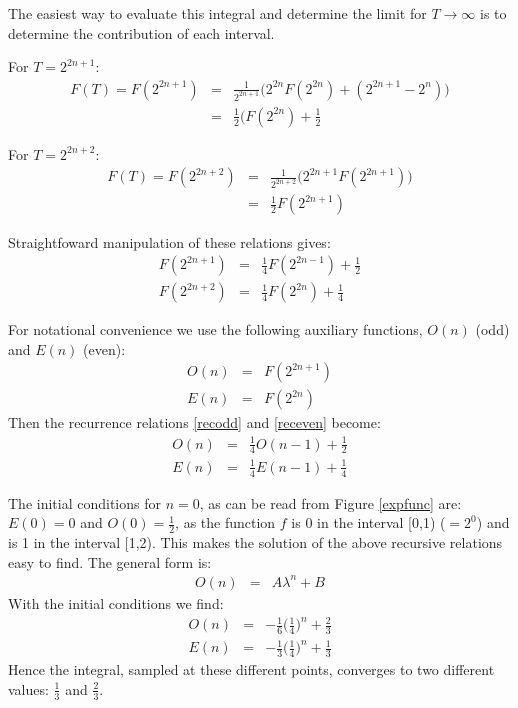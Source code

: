 \documentclass[onecolumn]{article}
\begin{document}
The easiest way to evaluate this integral and determine the limit for
$T \rightarrow \infty$ is to determine the contribution of each interval.

For $T = 2^{2n+1}$:
\begin{eqnarray}
    F(T) = F(2^{2n+1}) &=& \frac{1}{2^{2n+1}} \bigl ( 2^{2n}F(2^{2n}) + (2^{2n+1} - 2^n) \bigr ) \\
\nonumber              &=& \frac{1}{2} (F(2^{2n}) + \frac{1}{2}
\end{eqnarray}

For $T = 2^{2n+2}$:
\begin{eqnarray}
    F(T) = F(2^{2n+2}) &=& \frac{1}{2^{2n+2}} \bigl ( 2^{2n+1}F(2^{2n+1}) \bigr ) \\
\nonumber              &=& \frac{1}{2} F(2^{2n+1})
\end{eqnarray}

Straightfoward manipulation of these relations gives:
\begin{eqnarray}
\label{recodd}
    F(2^{2n+1}) &=& \frac{1}{4} F(2^{2n-1}) + \frac{1}{2} \\
\label{receven}
    F(2^{2n+2}) &=& \frac{1}{4} F(2^{2n}) + \frac{1}{4}
\end{eqnarray}

For notational convenience we use the following auxiliary functions, $O(n)$ (odd) and $E(n)$ (even):
\begin{eqnarray}
    O(n) &=& F(2^{2n+1}) \\
    E(n) &=& F(2^{2n})
\end{eqnarray}
Then the recurrence relations \ref{recodd} and \ref{receven} become:
\begin{eqnarray}
    O(n) &=& \frac{1}{4} O(n-1) + \frac{1}{2} \\
    E(n) &=& \frac{1}{4} E(n-1) + \frac{1}{4}
\end{eqnarray}

The initial conditions for $n = 0$, as can be read from Figure \ref{expfunc} are: $E(0) = 0$ and $O(0) = \frac{1}{2}$, as the
function $f$ is 0 in the interval [0,1) ($= 2^0$) and is 1 in the interval [1,2). This makes the solution of the
above recursive relations easy to find. The general form is:
\begin{eqnarray}
    O(n) &=& A \lambda^{n} + B
\end{eqnarray}
With the initial conditions we find:
\begin{eqnarray}
    O(n) &=& -\frac{1}{6} \bigl (\frac{1}{4} \bigr )^n + \frac{2}{3} \\
    E(n) &=& -\frac{1}{3} \bigl ( \frac{1}{4} \bigr )^n + \frac{1}{3}
\end{eqnarray}
Hence the integral, sampled at these different points, converges to two different values: $\frac{1}{3}$ and $\frac{2}{3}$.
\end{document}
